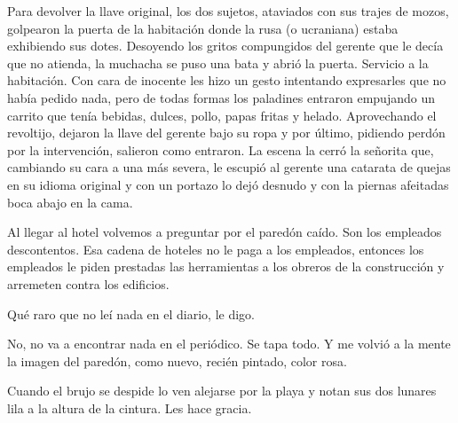 \documentclass[12pt,twoside,openright,a5paper]{book}
\begin{document}
Para devolver la llave original, los dos sujetos, ataviados con sus trajes
de mozos, golpearon la puerta de la habitación donde la rusa (o ucraniana)
estaba exhibiendo sus dotes. Desoyendo los gritos compungidos del gerente
que le decía que no atienda, la muchacha se puso una bata y abrió la
puerta. Servicio a la habitación. Con cara de inocente les hizo un gesto
intentando expresarles que no había pedido nada, pero de todas formas los
paladines entraron empujando un carrito que tenía bebidas, dulces, pollo,
papas fritas y helado. Aprovechando el revoltijo, dejaron la llave del
gerente bajo su ropa y por último, pidiendo perdón por la intervención,
salieron como entraron.  La escena la cerró la señorita que, cambiando
su cara a una más severa, le escupió al gerente una catarata de quejas
en su idioma original y con un portazo lo dejó desnudo y con la piernas
afeitadas boca abajo en la cama.


\vspace{0.5cm}

\hrulefill\hspace{0.2cm} \decofourleft\decofourright \hspace{0.2cm} \hrulefill
\vspace{0.5cm}

Al llegar al hotel volvemos a preguntar por el paredón caído. Son los
empleados descontentos. Esa cadena de hoteles no le paga a los empleados,
entonces los empleados le piden prestadas las herramientas a los obreros de
la construcción y arremeten contra los edificios.

Qué raro que no leí
nada en el diario, le digo.

No, no va a encontrar nada en el periódico. Se
tapa todo. Y me volvió a la mente la imagen del paredón, como nuevo,
recién pintado, color rosa.

\vspace{0.5cm}

\hrulefill\hspace{0.2cm} \decofourleft\decofourright \hspace{0.2cm} \hrulefill
\vspace{0.5cm}

Cuando el brujo se despide lo ven alejarse por la playa y notan sus dos lunares
lila a la altura de la cintura. Les hace gracia.

\vspace{0.5cm}

\hrulefill\hspace{0.2cm} \decofourleft\decofourright \hspace{0.2cm} \hrulefill
\vspace{0.5cm}
\end{document}
